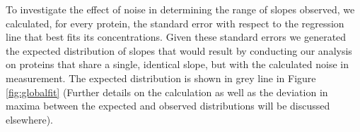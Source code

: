 To investigate the effect of noise in determining the range of slopes observed, we calculated, for every protein, the standard error with respect to the regression line that best fits its concentrations.
Given these standard errors we generated the expected distribution of slopes that would result by conducting our analysis on proteins that share a single, identical slope, but with the calculated noise in measurement.
The expected distribution is shown in grey line in Figure \ref{fig:globalfit} (Further details on the calculation as well as the deviation in maxima between the expected and observed distributions will be discussed elsewhere).